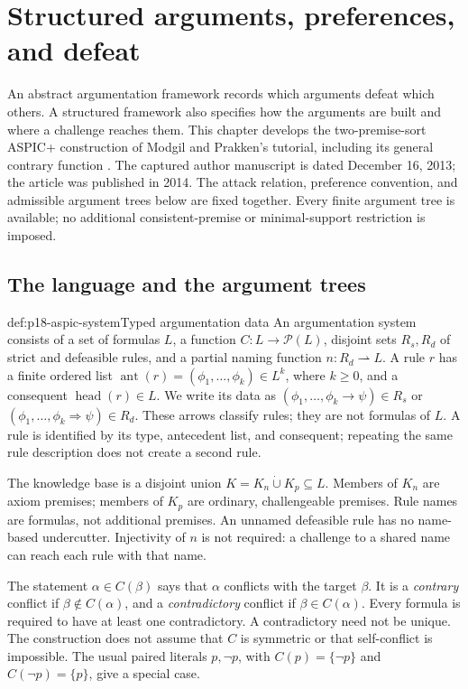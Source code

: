 \chapter{Structured arguments, preferences, and defeat}
\label{sec:p18-structured-argumentation}

An abstract argumentation framework records which arguments defeat which
others. A structured framework also specifies how the arguments are built
and where a challenge reaches them. This chapter develops the two-premise-sort
ASPIC+ construction of Modgil and Prakken's tutorial, including its general
contrary function \cite[Sections 3 and 5]{ModgilPrakken2014ASPICTutorial}.
The captured author manuscript is dated December 16, 2013; the article was
published in 2014. The attack relation, preference convention, and admissible
argument trees below are fixed together. Every finite argument tree is
available; no additional consistent-premise or minimal-support restriction
is imposed.

\section{The language and the argument trees}

\begin{hbdefinition}{def:p18-aspic-system}{Typed argumentation data}
An argumentation system consists of a set of formulas \(L\), a function
\(C:L\longrightarrow\mathcal P(L)\), disjoint sets \(R_s,R_d\) of strict and
defeasible rules, and a partial naming function \(n:R_d\rightharpoonup L\).
A rule \(r\) has a finite ordered list
\(\operatorname{ant}(r)=(\phi_1,\ldots,\phi_k)\in L^k\), where \(k\geq0\),
and a consequent \(\operatorname{head}(r)\in L\). We write its data as
\((\phi_1,\ldots,\phi_k\to\psi)\in R_s\) or
\((\phi_1,\ldots,\phi_k\Rightarrow\psi)\in R_d\).
These arrows classify rules; they are not formulas of \(L\).
A rule is identified by its type, antecedent list, and consequent;
repeating the same rule description does not create a second rule.

The knowledge base is a disjoint union \(K=K_n\mathbin{\dot\cup}K_p\subseteq L\).
Members of \(K_n\) are axiom premises; members of \(K_p\) are ordinary,
challengeable premises. Rule names are formulas, not additional premises.
An unnamed defeasible rule has no name-based undercutter. Injectivity of
\(n\) is not required: a challenge to a shared name can reach each rule
with that name.

The statement \(\alpha\in C(\beta)\) says that \(\alpha\) conflicts with the
target \(\beta\). It is a \emph{contrary} conflict if
\(\beta\notin C(\alpha)\), and a \emph{contradictory} conflict if
\(\beta\in C(\alpha)\). Every formula is required to have at least one
contradictory. A contradictory need not be unique. The construction does
not assume that \(C\) is symmetric or that self-conflict is impossible.
The usual paired literals \(p,\neg p\), with \(C(p)=\{\neg p\}\) and
\(C(\neg p)=\{p\}\), give a special case.
\end{hbdefinition}

